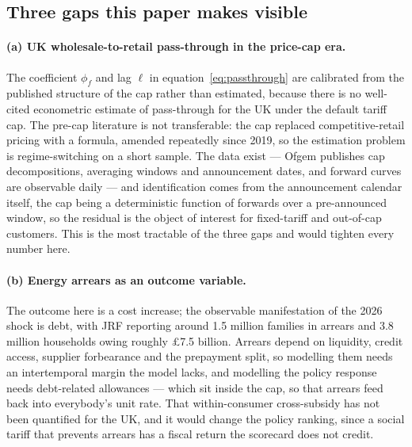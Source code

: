 \subsection{Three gaps this paper makes visible}

\paragraph{(a) UK wholesale-to-retail pass-through in the price-cap era.} The coefficient $\phi_f$ and lag $\ell$ in equation~\eqref{eq:passthrough} are calibrated from the published structure of the cap rather than estimated, because there is no well-cited econometric estimate of pass-through for the UK under the default tariff cap. The pre-cap literature is not transferable: the cap replaced competitive-retail pricing with a formula, amended repeatedly since 2019, so the estimation problem is regime-switching on a short sample. The data exist --- Ofgem publishes cap decompositions, averaging windows and announcement dates, and forward curves are observable daily --- and identification comes from the announcement calendar itself, the cap being a deterministic function of forwards over a pre-announced window, so the residual is the object of interest for fixed-tariff and out-of-cap customers. This is the most tractable of the three gaps and would tighten every number here.

\paragraph{(b) Energy arrears as an outcome variable.} The outcome here is a cost increase; the observable manifestation of the 2026 shock is debt, with JRF reporting around 1.5 million families in arrears and 3.8 million households owing roughly \pounds 7.5 billion. Arrears depend on liquidity, credit access, supplier forbearance and the prepayment split, so modelling them needs an intertemporal margin the model lacks, and modelling the policy response needs debt-related allowances --- which sit inside the cap, so that arrears feed back into everybody's unit rate. That within-consumer cross-subsidy has not been quantified for the UK, and it would change the policy ranking, since a social tariff that prevents arrears has a fiscal return the scorecard does not credit.

